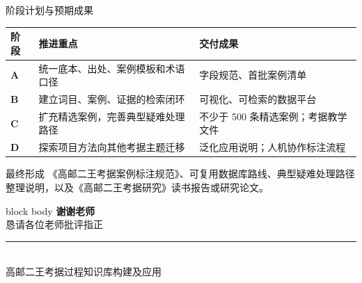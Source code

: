 \documentclass[aspectratio=169]{beamer}
\begin{document}
\begin{frame}{阶段计划与预期成果}
    \small
    \begin{table}[h]
        \centering
        \setlength{\tabcolsep}{4pt}
        \renewcommand{\arraystretch}{1.08}
        \begin{tabularx}{\textwidth}{>{\bfseries}l X X}
            \toprule
            阶段 & 推进重点 & 交付成果 \\
            \midrule
            A & 统一底本、出处、案例模板和术语口径 & 字段规范、首批案例清单 \\
            B & 建立词目、案例、证据的检索闭环 & 可视化、可检索的数据平台 \\
            C & 扩充精选案例，完善典型疑难处理路径 & 不少于 500 条精选案例；考据教学文件 \\
            D & 探索项目方法向其他考据主题迁移 & 泛化应用说明；人机协作标注流程 \\
            \bottomrule
        \end{tabularx}
    \end{table}
    \begin{block}{最终形成}
        《高邮二王考据案例标注规范》、可复用数据库路线、典型疑难处理路径整理说明，以及《高邮二王考据研究》读书报告或研究论文。
    \end{block}
\end{frame}

\begin{frame}[plain]
    \vspace{0.95cm}
    \begin{center}
        \begin{beamercolorbox}[wd=0.72\textwidth,sep=0.55cm,center,rounded=true,shadow=true]{block body}
            {\Huge\textcolor{rucRed}{\textbf{谢谢老师}}}\\[0.38cm]
            {\Large 恳请各位老师批评指正}\\[0.36cm]
            \textcolor{rucRed}{\rule{0.42\linewidth}{0.6pt}}\\[0.28cm]
            {\small 高邮二王考据过程知识库构建及应用}
        \end{beamercolorbox}
    \end{center}
\end{frame}
\end{document}
